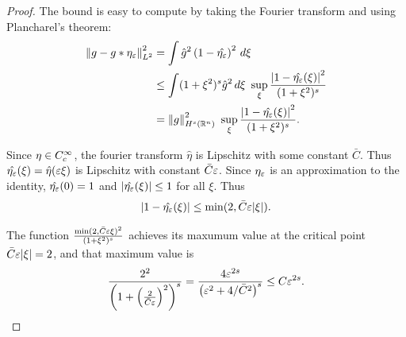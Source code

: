 \begin{proof}
The bound is easy to compute by taking the Fourier transform and using Plancharel's theorem:
\begin{align*} 
\left\lVert g - g\ast \eta_\varepsilon\right\rVert_{L^2}^2 &= \int \hat{g}^2 \left( 1 - \hat{\eta_\varepsilon} \right)^2 \,d\xi 
\\ &\leq \int (1+\xi^2)^s \hat{g}^2 \,d\xi \,\, \sup_{\xi} \frac{\left\lvert 1-\hat{\eta_\varepsilon}(\xi) \right\rvert^2}{(1+\xi^2)^s}
\\ &= \left\lVert g\right\rVert_{H^s(\mathbb{R}^n)}^2 \,\, \sup_{\xi} \frac{\left\lvert 1-\hat{\eta_\varepsilon}(\xi) \right\rvert^2}{(1+\xi^2)^s}.
\end{align*}

Since $\eta \in C_c^\infty$, the fourier transform $\hat{\eta}$ is Lipschitz with some constant $\bar{C}$. Thus $\hat{\eta_\varepsilon}(\xi) = \hat{\eta}(\varepsilon \xi)$ is Lipschitz with constant $\bar{C}\varepsilon$.  Since $\eta_\varepsilon$ is an approximation to the identity, $\hat{\eta_\varepsilon}(0) = 1$ and $\left\lvert \hat{\eta_\varepsilon}(\xi) \right\rvert \leq 1$ for all $\xi$.  Thus
\[ \left\lvert 1 - \hat{\eta_\varepsilon}(\xi) \right\rvert \leq \min(2,\bar{C}\varepsilon|\xi|). \]
%

The function $\frac{\min(2,\bar{C}\varepsilon\xi)^2}{(1+\xi^2)^s}$ achieves its maxumum value at the critical point $\bar{C}\varepsilon|\xi| = 2$, and that maximum value is 
\[ \frac{2^2}{\left( 1+\left( \frac{2}{\bar{C}\varepsilon} \right)^2 \right)^s} = \frac{4 \varepsilon^{2s}}{\left( \varepsilon^2 + 4/\bar{C}^2 \right)^s} \leq C \varepsilon^{2s}. \]
\end{proof}

%
%
%
%